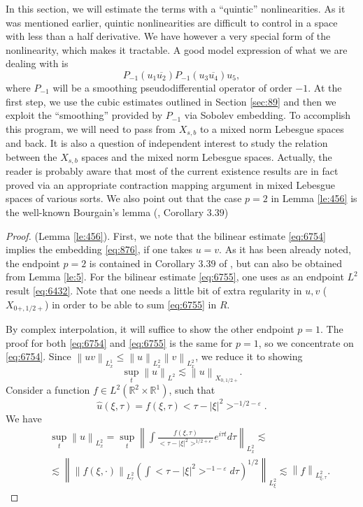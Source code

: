 \documentclass[draft,11pt,leqno]{amsart}
\newcommand{\norm}[2]{{\left\| #1 \right\|}_{#2}}
\newcommand{\ve}{\varepsilon}
\newcommand{\rone}{\mathbb R^1}
\newcommand{\rtwo}{\mathbb R^2}
\newcommand{\supl}{\sup\limits}
\newcommand{\f}{\displaystyle\frac}
\begin{document}
In this section, we will estimate the terms with a ``quintic'' nonlinearities.
As it was mentioned earlier, quintic nonlinearities are difficult to
control in a space with less than a half derivative. 
We have however a very special form of the nonlinearity, which makes 
it tractable. A good model expression of what we are dealing with is 
$$
P_{-1}(u_1\overline{u_2})P_{-1}(u_3 \overline{u_4})u_5,
$$
where $P_{-1}$ will be a smoothing pseudodifferential operator of order $-1$.
At the first step, we use the cubic estimates outlined in Section \ref{sec:89}
and then we exploit the ``smoothing'' provided by $P_{-1}$ via 
Sobolev embedding.
To accomplish this program,  we will need to pass from $X_{s,b}$ to a mixed
norm Lebesgue spaces and back. It is also a question of independent interest
to study the relation between the $X_{s,b}$ spaces and the 
mixed norm Lebesgue spaces. Actually, the reader 
is probably aware that most of the current existence 
results are in fact proved via 
an appropriate contraction mapping argument in mixed Lebesgue spaces of
various sorts. We also point out that the case $p=2$ in Lemma \ref{le:456}
is the well-known Bourgain's lemma (\cite{Bourgain}, Corollary $3.39$)
\begin{proof}(Lemma \ref{le:456}).
First, we note that the bilinear estimate \eqref{eq:6754} 
implies the embedding 
\eqref{eq:876}, if one takes $u=v$. 
As it has been already noted, the endpoint $p=2$ is contained in 
Corollary $3.39$ of \cite{Bourgain},
but can also be obtained from Lemma \ref{le:5}. 
For the bilinear estimate \eqref{eq:6755}, one uses as an endpoint 
$L^2$ result \eqref{eq:6432}. Note that one needs a little bit of extra
regularity in $u, v$ ($X_{0+,1/2+}$) in order to be able to sum 
\eqref{eq:6755} in $R$. 

By complex interpolation, it 
will suffice to show  the other endpoint $p=1$. The proof for both
\eqref{eq:6754} and \eqref{eq:6755} is the same for $p=1$, so we concentrate
on \eqref{eq:6754}. 
Since $\norm{uv}{L_x^1}\leq \norm{u}{L_x^2}\norm{v}{L_x^2}$, we reduce it to
showing
$$
\supl_t\norm{u}{L^2}\lesssim \norm{u}{X_{0,1/2+}}.
$$
Consider a function $f\in L^2(\rtwo\times \rone)$, such that 
$$
\widehat{u}(\xi,\tau)=f(\xi,\tau)<\tau-|\xi|^2>^{-1/2-\ve}.
$$
We have 
\begin{eqnarray*}
& &\supl_t\norm{u}{L^2_x}=
\supl_t\norm{\int\f{f(\xi,\tau)}{<\tau-|\xi|^2>^{1/2+\ve}} e^{i\tau t} d\tau}{L^2_x} \lesssim\\
& &\lesssim \norm{\norm{f(\xi,\cdot)}{L^2_{\tau}}\left(\int <\tau-|\xi|^2>^{-1-\ve}d\tau\right)^{1/2}}{L^2_{\xi}}
\lesssim \norm{f}{L^2_{\xi,\tau}}. 
\end{eqnarray*}
\end{proof}
\end{document}
